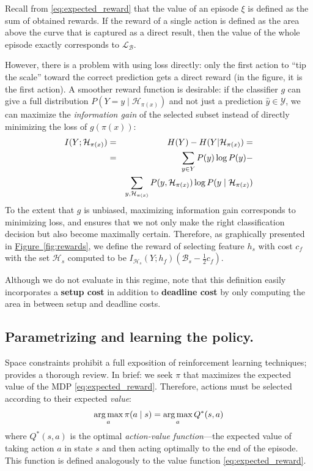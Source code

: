 Recall from \eqref{eq:expected_reward} that the value of an episode $\xi$ is defined as the sum of obtained rewards.
If the reward of a single action is defined as the area above the curve that is captured as a direct result, then the value of the whole episode exactly corresponds to $\mathcal{L}_\mathcal{B}$.

However, there is a problem with using loss directly: only the first action to ``tip the scale'' toward the correct prediction gets a direct reward (in the figure, it is the first action).  A smoother reward function is desirable:
if the classifier $g$ can give a full distribution $P(Y = y \mid \mathcal{H}_{\pi(x)})$ and not just a prediction $\hat{y} \in \mathcal{Y}$, we can maximize the \emph{information gain} of the selected subset instead of directly minimizing the loss of $g(\pi(x))$:
\begin{eqnarray}
I(Y; \mathcal{H}_{\pi(x)}) &=& H(Y) - H(Y | \mathcal{H}_{\pi(x)}) = \\ \notag
&=& \sum_{y \in Y} P(y) \log P(y) -  \\ \notag
&&\sum_{y, \mathcal{H}_{\pi(x)}} P(y, \mathcal{H}_{\pi(x)}) \log P(y \mid \mathcal{H}_{\pi(x)})
\end{eqnarray}
To the extent that $g$ is unbiased, maximizing information gain corresponds to minimizing loss, and ensures that we not only make the right classification decision but also become maximally certain.
Therefore, as graphically presented in \hyperref[fig:rewards]{Figure~\ref*{fig:rewards}}, we define the reward of selecting feature $h_s$ with cost $c_f$ with the set $\mathcal{H}_s$ computed to be $I_{\mathcal{H}_s}(Y; h_f) (\mathcal{B}_s - \frac{1}{2}c_f)$.

Although we do not evaluate in this regime, note that this definition easily incorporates a \textbf{setup cost} in addition to \textbf{deadline cost} by only computing the area in between setup and deadline costs.

\subsection{Parametrizing and learning the policy.}

Space constraints prohibit a full exposition of reinforcement learning techniques; \parencite{Sutton1998} provides a thorough review.
In brief: we seek $\pi$ that maximizes the expected value of the MDP \eqref{eq:expected_reward}.
Therefore, actions must be selected according to their expected \emph{value}:
\begin{align*}
\operatorname*{arg\,max}_a \pi(a \mid s) = \operatorname*{arg\,max}_a Q^*(s,a)
\end{align*}
where $Q^*(s,a)$ is the optimal \emph{action-value function}---the expected value of taking action $a$ in state $s$ and then acting optimally to the end of the episode.
This function is defined analogously to the value function \eqref{eq:expected_reward}.

